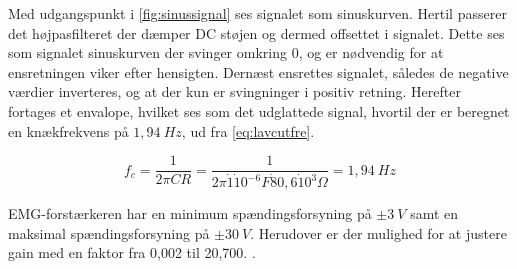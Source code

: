 Med udgangspunkt i \autoref{fig:sinussignal} ses signalet som sinuskurven. Hertil passerer det højpasfilteret der dæmper DC støjen og dermed offsettet i signalet. Dette ses som signalet sinuskurven der svinger omkring 0, og er nødvendig for at ensretningen viker efter hensigten. Dernæst ensrettes signalet, således de negative værdier inverteres, og at der kun er svingninger i positiv retning. Herefter fortages et envalope, hvilket ses som det udglattede signal, hvortil der er beregnet en knækfrekvens på $1,94~Hz$, ud fra \autoref{eq:lavcutfre}. 

\begin{equation}\label{eq:lavcutfre}
f_c = \frac{1}{2 \pi C R} = \frac{1}{2 \pi \dot 1 \dot 10^{-6}F \dot 80,6 \dot 10^3\Omega} = 1,94~Hz
\end{equation}

EMG-forstærkeren har en minimum spændingsforsyning på $\pm 3~V$ samt en maksimal spændingsforsyning på $\pm 30~V$. Herudover er der mulighed for at justere gain med en faktor fra 0,002 til 20,700. \citep{advancertech2013}. 













